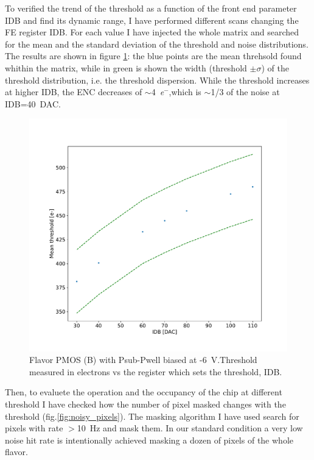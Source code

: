         To verified the trend of the threshold as a function of the front end parameter IDB and find its dynamic range, I have performed different scans changing the FE register IDB. For each value I have injected the whole matrix and searched for the mean and the standard deviation of the threshold and noise distributions. The results are shown in figure \ref{fig:threshold_vs_IDB}: the blue points are the mean threhsold found whithin the matrix, while in green is shown the width (threshold $\pm \sigma$) of the threshold distribution, i.e. the threshold dispersion. 
        While the threshold increases at higher IDB, the ENC decreases of $\sim$\SI{4}{\elementarycharge}$^-$,which is $\sim$1/3 of the noise at IDB=\SI{40}{DAC}. 
        \begin{figure}[h!]
            \centering
            \includegraphics[width=.70\linewidth]{figures/charaterization/thr_vs_IDB.pdf}
            \caption{Flavor PMOS (B) with Psub-Pwell biased at -\SI{6}{V}.Threshold measured in electrons vs the register which sets the threshold, IDB.  }
            \label{fig:threshold_vs_IDB}
        \end{figure}            
        Then, to evaluete the operation and the occupancy of the chip at different threshold I have checked how the number of pixel masked changes with the threshold (fig.\ref{fig:noisy_pixels}). The masking algorithm I have used search for pixels with rate $>$\SI{10}{Hz} and mask them. In our standard condition a very low noise hit rate is intentionally achieved masking a dozen of pixels of the whole flavor.
